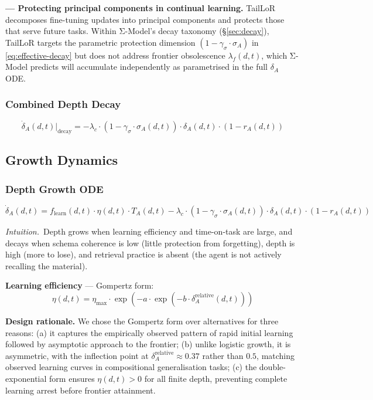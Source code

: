 \textbf{\cite{taillor2026} --- Protecting principal components in continual learning.}
TailLoR decomposes fine-tuning updates into principal components and protects
those that serve future tasks. Within Σ-Model's decay taxonomy
(\S\ref{sec:decay}), TailLoR targets the parametric protection dimension
$(1 - \gamma_\sigma \cdot \sigma_A)$ in \eqref{eq:effective-decay} but does not
address frontier obsolescence $\lambda_f(d,t)$, which Σ-Model predicts will
accumulate independently as parametrised in the full $\delta_A$ ODE.

\subsubsection{Combined Depth Decay}
\begin{equation}\label{eq:depth-decay}
\dot{\delta}_A(d,t)\big|_{\text{decay}} = -\lambda_c \cdot (1 - \gamma_\sigma \cdot \sigma_A(d,t)) \cdot \delta_A(d,t) \cdot (1 - r_A(d,t))
\end{equation}

\subsection{Growth Dynamics}\label{sec:growth}

\subsubsection{Depth Growth ODE}
\begin{equation}\label{eq:depth-ode}
\dot{\delta}_A(d,t) = f_{\text{learn}}(d,t) \cdot \eta(d,t) \cdot T_A(d,t) - \lambda_c \cdot (1 - \gamma_\sigma \cdot \sigma_A(d,t)) \cdot \delta_A(d,t) \cdot (1 - r_A(d,t))
\end{equation}

\noindent\textit{Intuition.}\ Depth grows when
learning efficiency and time-on-task are large, and decays when schema
coherence is low (little protection from forgetting), depth is high
(more to lose), and retrieval practice is absent (the agent is not
actively recalling the material).

\textbf{Learning efficiency} --- Gompertz form:
\begin{equation}\label{eq:gompertz}
\eta(d,t) = \eta_{\text{max}} \cdot \exp(-a \cdot \exp(-b \cdot \delta_A^{\text{relative}}(d,t)))
\end{equation}

\textbf{Design rationale.} We chose the Gompertz form over alternatives
for three reasons: (a) it captures the empirically observed pattern of
rapid initial learning followed by asymptotic approach to the frontier;
(b) unlike logistic growth, it is asymmetric, with the inflection point
at $\delta_A^{\text{relative}} \approx 0.37$ rather than $0.5$, matching
observed learning curves in compositional generalisation tasks; (c) the
double-exponential form ensures $\eta(d,t) > 0$ for all finite depth,
preventing complete learning arrest before frontier attainment.

